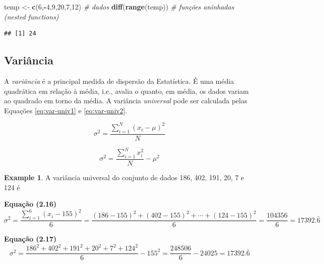 \documentclass[
]{book}
\newenvironment{Shaded}{\begin{snugshade}}{\end{snugshade}}
\newcommand{\CommentTok}[1]{\textcolor[rgb]{0.56,0.35,0.01}{\textit{#1}}}
\newcommand{\DecValTok}[1]{\textcolor[rgb]{0.00,0.00,0.81}{#1}}
\newcommand{\KeywordTok}[1]{\textcolor[rgb]{0.13,0.29,0.53}{\textbf{#1}}}
\newcommand{\NormalTok}[1]{#1}
\newcommand{\OperatorTok}[1]{\textcolor[rgb]{0.81,0.36,0.00}{\textbf{#1}}}
\newcommand{\StringTok}[1]{\textcolor[rgb]{0.31,0.60,0.02}{#1}}
\theoremstyle{definition}
\theoremstyle{definition}
\newtheorem{example}{Example}[chapter]
\theoremstyle{definition}
\theoremstyle{remark}
\begin{document}
\begin{Shaded}
\begin{Highlighting}[]
\NormalTok{temp \textless{}{-}}\StringTok{ }\KeywordTok{c}\NormalTok{(}\DecValTok{6}\NormalTok{,}\OperatorTok{{-}}\DecValTok{4}\NormalTok{,}\DecValTok{9}\NormalTok{,}\DecValTok{20}\NormalTok{,}\DecValTok{7}\NormalTok{,}\DecValTok{12}\NormalTok{) }\CommentTok{\# dados}
\KeywordTok{diff}\NormalTok{(}\KeywordTok{range}\NormalTok{(temp))         }\CommentTok{\# funções aninhadas (\textquotesingle{}nested functions\textquotesingle{})}
\end{Highlighting}
\end{Shaded}

\begin{verbatim}
## [1] 24
\end{verbatim}

\hypertarget{variuxe2ncia}{%
\subsection{Variância}\label{variuxe2ncia}}

A \emph{variância} é a principal medida de dispersão da Estatística. É uma média quadrática em relação à média, i.e., avalia o quanto, em média, os dados variam ao quadrado em torno da média. A variância \emph{universal} pode ser calculada pelas Equações \eqref{eq:var-univ1} e \eqref{eq:var-univ2}.

\begin{equation}
\sigma^2 = \frac{\sum_{i=1}^N (x_i - \mu)^2}{N}
\label{eq:var-univ1}
\end{equation}

\begin{equation}
\sigma^2 = \frac{\sum_{i=1}^N x_{i}^2}{N} - \mu^2
\label{eq:var-univ2}
\end{equation}

\begin{example}
\protect\hypertarget{exm:var-univ-descr}{}{\label{exm:var-univ-descr} }A variância universal do conjunto de dados 186, 402, 191, 20, 7 e 124 é\\
\end{example}

\textbf{Equação (2.16)} \[\sigma^2 = \frac{\sum_{i=1}^6 (x_i - 155)^2}{6} = \frac{(186-155)^2+(402-155)^2+ \cdots + (124-155)^2}{6} = \frac{104356}{6} = 17392.\bar{6}\]

\textbf{Equação (2.17)} \[\sigma^2 = \frac{186^2+402^2+191^2+20^2+7^2+124^2}{6} - 155^2 = \frac{248506}{6} - 24025 = 17392.\bar{6}\]
\end{document}
